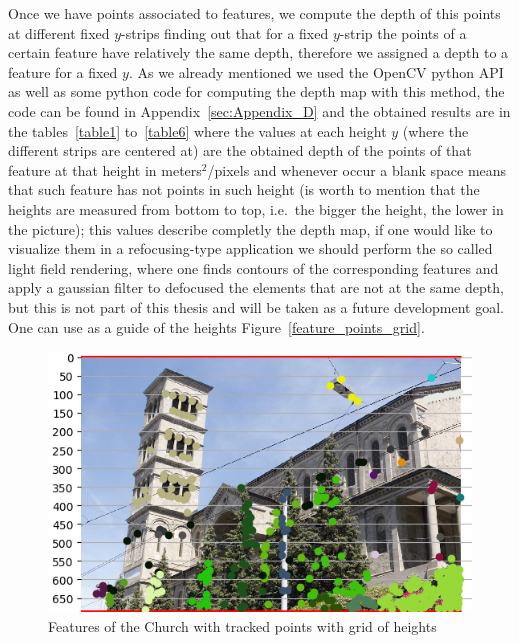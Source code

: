 Once we have points associated to features, we compute the depth of this points at different fixed $y$-strips finding out that for a fixed $y$-strip the points of a certain feature have relatively the same depth, therefore we assigned a depth to a feature for a fixed $y$. As we already mentioned we used the OpenCV python API as well as some python code for computing the depth map with this method, the code can be found in Appendix~\ref{sec:Appendix_D} and the obtained results are in the tables~\ref{table1} to~\ref{table6} where the values at each height $y$ (where the different strips are centered at) are the obtained depth of the points of that feature at that height in meters$^2$/pixels and whenever occur a blank space means that such feature has not points in such height (is worth to mention that the heights are measured from bottom to top, i.e.\ the bigger the height, the lower in the picture); this values describe completly the depth map, if one would like to visualize them in a refocusing-type application we should perform the so called light field rendering, where one finds contours of the corresponding features and apply a gaussian filter to defocused the elements that are not at the same depth, but this is not part of this thesis and will be taken as a future development goal. One can use as a guide of the heights Figure~\ref{feature_points_grid}. 

\begin{figure}[h!]
\centering
\includegraphics[width = 0.9 \textwidth]{./Diagrams/results/data_set/feature_points_grid.png}
\caption{Features of the Church with tracked points with grid of heights}
\label{fig:feature_points_grid}
\end{figure}


